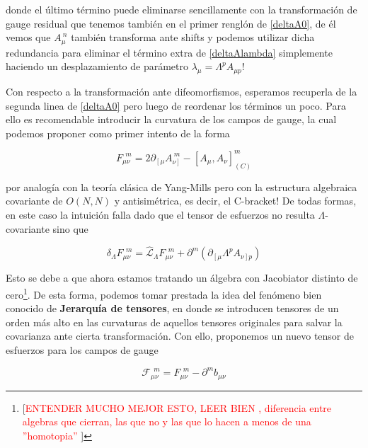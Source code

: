 \documentclass{article}
\numberwithin{equation}{section}
\begin{document}
donde el último término puede eliminarse sencillamente con la transformación de gauge residual que tenemos también en el primer renglón de \ref{deltaA0}, de él vemos que $ A_{\mu}^{\ n} $ también transforma ante shifts y podemos utilizar dicha redundancia para eliminar el término extra de \ref{deltaAlambda} simplemente haciendo un desplazamiento de parámetro $ \lambda_{\mu} = \Lambda^p A_{\mu p}  $!

Con respecto a la transformación ante difeomorfismos, esperamos recuperla de la segunda linea de \ref{deltaA0} pero luego de reordenar los términos un poco. Para ello es recomendable introducir la curvatura de los campos de gauge, la cual podemos proponer como primer intento de la forma

\begin{equation}\label{F}
F_{\mu \nu}^{\ \ m} = 2 \partial_{\left[\mu\right.} A_{\left. \nu\right]}^{\ m} - \left[A_{\mu}, A_{\nu} \right]_{(C)}^m 
\end{equation} 

por analogía con la teoría clásica de Yang-Mills pero con la estructura algebraica covariante de $ O(N,N) $ y antisimétrica, es decir, el C-bracket! De todas formas, en este caso la intuición falla dado que el tensor de esfuerzos no resulta $\Lambda$-covariante sino que

\begin{equation}\label{fallaF}
\delta_{\Lambda} F_{\mu \nu}^{\ \ m} = \hat{\mathcal{L}}_{\Lambda} F_{\mu \nu}^{\ \ m} + \partial^m \left( \partial_{\left[\mu\right.} \Lambda^p A_{\left. \nu\right] p} \right)
\end{equation} 

Esto se debe a que ahora estamos tratando un álgebra con Jacobiator distinto de cero\footnote{[\textcolor{red}{ENTENDER MUCHO MEJOR ESTO, LEER BIEN , diferencia entre algebras que cierran, las que no y las que lo hacen a menos de una ''homotopia'' }]}. De esta forma, podemos tomar prestada la idea del fenómeno bien conocido de \textbf{Jerarquía de tensores}, en donde se introducen tensores de un orden más alto en las curvaturas de aquellos tensores originales para salvar la covarianza ante cierta transformación. Con ello, proponemos un nuevo tensor de esfuerzos para los campos de gauge

\begin{equation}\label{Fcovariante}
\mathcal{F}_{\mu \nu}^{\ \ m} =  F_{\mu \nu}^{\ \ m} - \partial^m b_{\mu \nu} 
\end{equation} 
\end{document}
